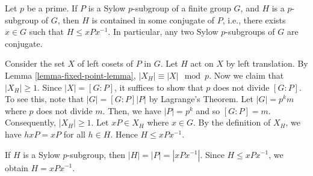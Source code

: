 \begin{theorem} \label{thm-second-sylow-thm}
	Let $p$ be a prime. If $P$ is a Sylow $p$-subgroup of a finite group $G$, and $H$ is a $p$-subgroup of $G$, then $H$ is contained in some conjugate of $P$, i.e., there exists $x\in G$ such that $H\leq xPx^{-1}$. In particular, any two Sylow $p$-subgroups of $G$ are conjugate.
\end{theorem}
\begin{sketch}
	Consider the set $X$ of left cosets of $P$ in $G$. Let $H$ act on $X$ by left translation. By Lemma \ref{lemma-fixed-point-lemma}, $|X_H|\equiv |X| \mod p$. Now we claim that $|X_H|\geq 1$. Since $|X| = [G:P]$, it suffices to show that $p$ does not divide $[G:P]$. To see this, note that $|G| = [G:P]|P|$ by Lagrange's Theorem. Let $|G| = p^k m$ where $p$ does not divide $m$. Then, we have $|P| = p^k$ and so $[G:P] = m$. Consequently, $|X_H|\geq 1$. Let $xP\in X_H$ where $x\in G$. By the definition of $X_H$, we have
$hxP = xP$ for all $h\in H$. Hence $H\leq xPx^{-1}$.

If $H$ is a Sylow $p$-subgroup, then $|H| = |P| = |xPx^{-1}|$. Since $H\leq xPx^{-1}$, we obtain $H = xPx^{-1}$.
\end{sketch}

